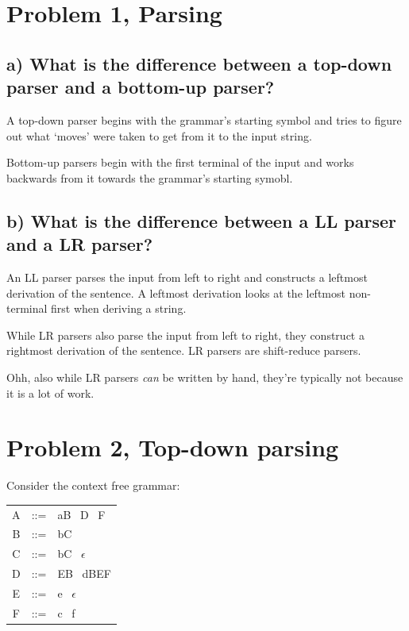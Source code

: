 \section{Problem 1, Parsing}
\subsection{a) What is the difference between a top-down parser and a bottom-up parser?}
A top-down parser begins with the grammar's starting symbol and tries to figure out what `moves' were taken to get from it to the input string.

Bottom-up parsers begin with the first terminal of the input and works backwards from it towards the grammar's starting symobl.


\subsection{b) What is the difference between a LL parser and a LR parser?}

An LL parser parses the input from left to right and constructs a leftmost derivation of the sentence.
A leftmost derivation looks at the leftmost non-terminal first when deriving a string.

While LR parsers also parse the input from left to right, they construct a rightmost derivation of the sentence.
LR parsers are shift-reduce parsers.

Ohh, also while LR parsers \textit{can} be written by hand, they're typically not because it is a lot of work.


\section{Problem 2, Top-down parsing}
Consider the context free grammar:
\begin{table}[H]
\begin{tabular}{ccl}
	A	& ::=	& aB \textbar ~D \textbar  ~F \\
	B 	& ::=	& bC \\
	C 	& ::=	& bC \textbar ~$\epsilon$ \\
	D  	& ::=	& EB \textbar ~dBEF \\
	E 	& ::=	& e \textbar ~$\epsilon$ \\
	F 	& ::=	& c \textbar ~f 
\end{tabular}
\end{table}


